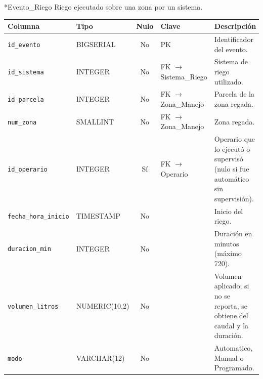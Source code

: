\documentclass[11pt,letterpaper]{article}
\makeatletter
\renewcommand\subsubsection{\@startsection{subsubsection}{3}{\z@}{-3.25ex\@plus -1ex \@minus -.2ex}{1.5ex \@plus .2ex}{\normalfont\normalsize\bfseries}}
\makeatother
\begin{document}
\subsubsection*{Evento\_Riego}
Riego ejecutado sobre una zona por un sistema.
{\footnotesize
\begin{longtable}{>{\raggedright\arraybackslash}p{3.3cm}>{\raggedright\arraybackslash}p{2.5cm}c>{\raggedright\arraybackslash}p{2.2cm}>{\raggedright\arraybackslash}p{6.1cm}}
\toprule
\textbf{Columna} & \textbf{Tipo} & \textbf{Nulo} & \textbf{Clave} & \textbf{Descripción} \\
\midrule
\endhead
\texttt{id\_evento} & BIGSERIAL & No & PK & Identificador del evento. \\
\texttt{id\_sistema} & INTEGER & No & FK $\to$ Sistema\_Riego & Sistema de riego utilizado. \\
\texttt{id\_parcela} & INTEGER & No & FK $\to$ Zona\_Manejo & Parcela de la zona regada. \\
\texttt{num\_zona} & SMALLINT & No & FK $\to$ Zona\_Manejo & Zona regada. \\
\texttt{id\_operario} & INTEGER & Sí & FK $\to$ Operario & Operario que lo ejecutó o supervisó (nulo si fue automático sin supervisión). \\
\texttt{fecha\_hora\_inicio} & TIMESTAMP & No &  & Inicio del riego. \\
\texttt{duracion\_min} & INTEGER & No &  & Duración en minutos (máximo 720). \\
\texttt{volumen\_litros} & NUMERIC(10,2) & No &  & Volumen aplicado; si no se reporta, se obtiene del caudal y la duración. \\
\texttt{modo} & VARCHAR(12) & No &  & Automatico, Manual o Programado. \\
\bottomrule
\end{longtable}}
\medskip
\end{document}
